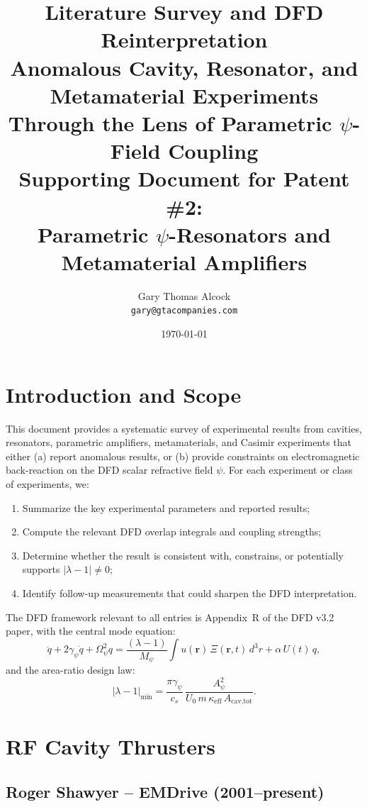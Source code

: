 \documentclass[12pt,letterpaper]{article}
\title{\textbf{Literature Survey and DFD Reinterpretation}\\[6pt]
  \Large Anomalous Cavity, Resonator, and Metamaterial Experiments\\
  Through the Lens of Parametric $\psi$-Field Coupling\\[12pt]
  \normalsize Supporting Document for Patent \#2:\\
  Parametric $\psi$-Resonators and Metamaterial Amplifiers}
\author{Gary Thomas Alcock\\
  \texttt{gary@gtacompanies.com}}
\date{\today}
\begin{document}
\maketitle
\tableofcontents
\newpage

\section{Introduction and Scope}

This document provides a systematic survey of experimental results from
cavities, resonators, parametric amplifiers, metamaterials, and Casimir
experiments that either (a) report anomalous results, or (b) provide
constraints on electromagnetic back-reaction on the DFD scalar refractive
field $\psi$.  For each experiment or class of experiments, we:
\begin{enumerate}[noitemsep]
  \item Summarize the key experimental parameters and reported results;
  \item Compute the relevant DFD overlap integrals and coupling
    strengths;
  \item Determine whether the result is consistent with, constrains,
    or potentially supports $|\lambda - 1| \neq 0$;
  \item Identify follow-up measurements that could sharpen the DFD
    interpretation.
\end{enumerate}

The DFD framework relevant to all entries is Appendix~R of the DFD v3.2
paper, with the central mode equation:
\begin{equation}
  \ddot{q} + 2\gamma_\psi\dot{q} + \Omega_\psi^2 q
  = \frac{(\lambda-1)}{M_\psi}\int u(\mathbf{r})\,\Xi(\mathbf{r},t)\,d^3r
    + \alpha\,U(t)\,q,
\end{equation}
and the area-ratio design law:
\begin{equation}
  |\lambda - 1|_{\min} = \frac{\pi\gamma_\psi}{c_s}\,
    \frac{A_\psi^2}{U_0\,m\,\kappa_{\text{eff}}\,A_{\text{cav,tot}}}.
\end{equation}

\section{RF Cavity Thrusters}

\subsection{Roger Shawyer -- EMDrive (2001--present)}
\end{document}
